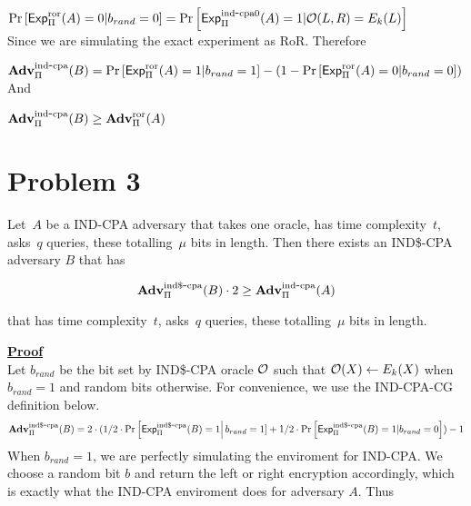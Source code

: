 \documentclass[11pt]{article}
\newcommand{\ExpRoR}[2]{\mathsf{Exp}^{\mathrm{ror}}_{#1}{(#2)}}
\newcommand{\ExpINDz}[2]{\mathsf{Exp}^{\mathrm{ind}\mbox{-}\mathrm{cpa0}}_{#1}{(#2)}}
\newcommand{\ExpINDR}[2]{\mathsf{Exp}^{\mathrm{ind\$}\mbox{-}\mathrm{cpa}}_{#1}{(#2)}}
\newcommand{\AdvRoR}[2]{\Adv^{\mathrm{ror}}_{#1}(#2)}
\newcommand{\AdvINDR}[2]{\Adv^{\mathrm{ind\$}\mbox{-}\mathrm{cpa}}_{#1}(#2)}
\newcommand{\AdvIND}[2]{\Adv^{\mathrm{ind}\mbox{-}\mathrm{cpa}}_{#1}(#2)}
\begin{document}
$\Pr\left[\ExpRoR{\Pi}{A}=0 | b_{rand}=0 \right] = \Pr\left[\ExpINDz{\Pi}{A}=1 | \calO(L,R) = E_k(L) \right] $\\

Since we are simulating the exact experiment as RoR. Therefore
  
$\AdvIND{\Pi}{B} = \Pr\left[\ExpRoR{\Pi}{A}=1 |  b_{rand}=1 \right] - (1 - \Pr\left[\ExpRoR{\Pi}{A}=0 |  b_{rand}=0 \right])$\\ 

And

$\AdvIND{\Pi}{B} \geq  \AdvRoR{\Pi}{A}  $\\ 

\section*{Problem 3}

Let~$A$ be a IND-CPA adversary that takes one oracle, has time complexity~$t$, asks~$q$
queries, these totalling~$\mu$ bits in length.  Then there exists an IND\$-CPA adversary $B$ that has 

\[
\AdvINDR{\Pi}{B}\cdot 2 \geq \AdvIND{\Pi}{A}
\]

that has time complexity~$t$, asks~$q$ queries, these totalling~$\mu$ bits in length.   

\begin{figure*}[h]
\center
{}

\end{figure*}




{\bf \underline{Proof}}\\


Let $b_{rand}$ be the bit set by IND\$-CPA oracle ${\cal O}$ such that ${\cal O}(X) \gets E_k(X)$ when $b_{rand}=1$ and random bits otherwise.  For convenience, we use the IND-CPA-CG definition below. \\
\[
\AdvINDR{\Pi}{B} = 2 \cdot ( 1/2 \cdot \Pr\left[\ExpINDR{\Pi}{B}=1 \right| b_{rand} = 1] + 1/2 \cdot \Pr\left[\ExpINDR{\Pi}{B}=1 | b_{rand} = 0 \right]) - 1\\
\]
When $b_{rand}=1$, we are perfectly simulating the enviroment for IND-CPA. We choose a random bit $b$ and return the left or right encryption accordingly, which is exactly what the IND-CPA enviroment does for adversary $A$. Thus
\end{document}
